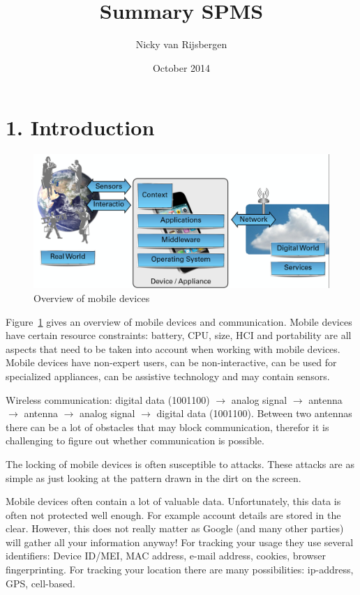 \documentclass{article}
\title{Summary SPMS}
\author{Nicky van Rijsbergen}
\date{October 2014}
\begin{document}
\maketitle

\section*{1. Introduction}

\begin{figure}[!h]
\centering
\includegraphics[width=\textwidth, height=\textheight, keepaspectratio]{images/overview_network.png}
\caption{Overview of mobile devices}
\label{fig:overview_mobile_devices}
\end{figure}

Figure~\ref{fig:overview_mobile_devices} gives an overview of mobile devices and communication. Mobile devices have certain resource constraints: battery, CPU, size, HCI and portability are all aspects that need to be taken into account when working with mobile devices. Mobile devices have non-expert users, can be non-interactive, can be used for specialized appliances, can be assistive technology and may contain sensors.

Wireless communication: digital data (1001100) $\rightarrow$ analog signal $\rightarrow$ antenna $\rightarrow$ antenna $\rightarrow$ analog signal $\rightarrow$ digital data (1001100). Between two antennas there can be a lot of obstacles that may block communication, therefor it is challenging to figure out whether communication is possible.

The locking of mobile devices is often susceptible to attacks. These attacks are as simple as just looking at the pattern drawn in the dirt on the screen.

Mobile devices often contain a lot of valuable data. Unfortunately, this data is often not protected well enough. For example account details are stored in the clear. However, this does not really matter as Google (and many other parties) will gather all your information anyway! For tracking your usage they use several identifiers: Device ID/MEI, MAC address, e-mail address, cookies, browser fingerprinting. For tracking your location there are many possibilities: ip-address, GPS, cell-based.
\end{document}
